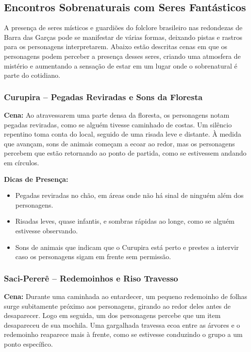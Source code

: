\subsection{Encontros Sobrenaturais com Seres Fantásticos}

A presença de seres místicos e guardiões do folclore brasileiro nas redondezas de Barra das Garças pode se manifestar de várias formas, deixando pistas e rastros para os personagens interpretarem. Abaixo estão descritas cenas em que os personagens podem perceber a presença desses seres, criando uma atmosfera de mistério e aumentando a sensação de estar em um lugar onde o sobrenatural é parte do cotidiano.

\subsubsection{Curupira – Pegadas Reviradas e Sons da Floresta}

\textbf{Cena:} Ao atravessarem uma parte densa da floresta, os personagens notam pegadas reviradas, como se alguém tivesse caminhado de costas. Um silêncio repentino toma conta do local, seguido de uma risada leve e distante. À medida que avançam, sons de animais começam a ecoar ao redor, mas os personagens percebem que estão retornando ao ponto de partida, como se estivessem andando em círculos.

\textbf{Dicas de Presença:}  
\begin{itemize}
    \item Pegadas reviradas no chão, em áreas onde não há sinal de ninguém além dos personagens.
    \item Risadas leves, quase infantis, e sombras rápidas ao longe, como se alguém estivesse observando.
    \item Sons de animais que indicam que o Curupira está perto e prestes a intervir caso os personagens sigam em frente sem permissão.
\end{itemize}

\subsubsection{Saci-Pererê – Redemoinhos e Riso Travesso}

\textbf{Cena:} Durante uma caminhada ao entardecer, um pequeno redemoinho de folhas surge subitamente próximo aos personagens, girando ao redor deles antes de desaparecer. Logo em seguida, um dos personagens percebe que um item desapareceu de sua mochila. Uma gargalhada travessa ecoa entre as árvores e o redemoinho reaparece mais à frente, como se estivesse conduzindo o grupo a um ponto específico.

